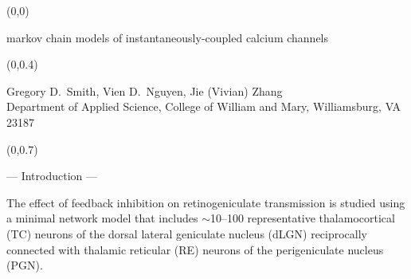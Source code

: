 \documentclass[a0]{a0poster}
\def\CHead#1{\begin{center} {\LARGE\color{DarkBlue} #1} \end{center}}
\def\Title#1{\begin{center} {\sc \Huge\color{DarkBlue} #1} \end{center} }
\begin{document}
%
%


\begin{textblock}{23}(0,0)
\Title{markov chain models of instantaneously-coupled calcium channels}
\end{textblock}

\begin{textblock}{23}(0,0.4)
\CHead{Gregory D.~Smith, Vien D.~Nguyen, Jie (Vivian) Zhang\\[0.2in]
Department of Applied Science, College of William and Mary, Williamsburg, VA 23187} 
\end{textblock}


\begin{textblock}{5.3}(0,0.7)
\CHead{--- Introduction ---}
The effect of feedback inhibition on retinogeniculate transmission is studied
using a minimal network model that includes $\sim$10--100 representative
thalamocortical (TC) neurons of the dorsal lateral geniculate nucleus (dLGN)
reciprocally connected with thalamic reticular (RE) neurons of the
perigeniculate nucleus (PGN).  \end{textblock}
\end{document}
